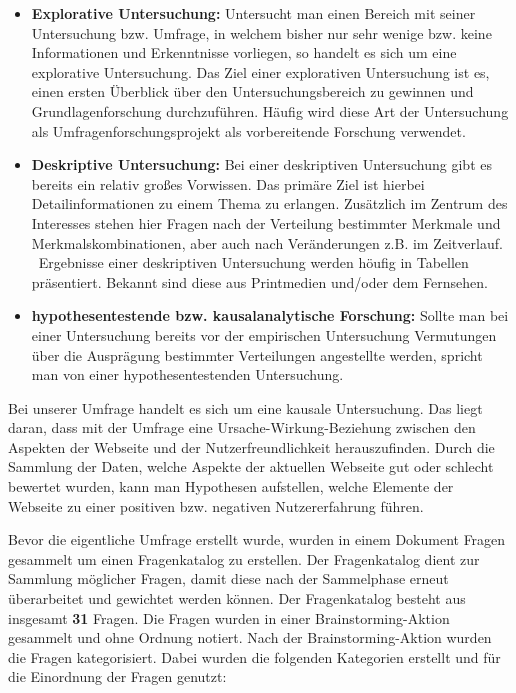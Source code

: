 \begin{itemize}
    \item \textbf{Explorative Untersuchung:} Untersucht man einen Bereich mit seiner Untersuchung bzw. Umfrage, in welchem bisher nur sehr wenige bzw. keine Informationen und Erkenntnisse vorliegen, so handelt es sich um eine explorative Untersuchung. Das Ziel einer explorativen Untersuchung ist es, einen ersten Überblick über den Untersuchungsbereich zu gewinnen und Grundlagenforschung durchzuführen. Häufig wird diese Art der Untersuchung als Umfragenforschungsprojekt als vorbereitende Forschung verwendet. \cite{umfrage:2011}
    \item \textbf{Deskriptive Untersuchung:} Bei einer deskriptiven Untersuchung gibt es bereits ein relativ großes Vorwissen. Das primäre Ziel ist hierbei Detailinformationen zu einem Thema zu erlangen. Zusätzlich im Zentrum des Interesses stehen hier Fragen nach der Verteilung bestimmter Merkmale und Merkmalskombinationen, aber auch nach Veränderungen z.B. im Zeitverlauf. \cite{umfrage:2011}\ Ergebnisse einer deskriptiven Untersuchung werden höufig in Tabellen präsentiert. Bekannt sind diese aus Printmedien und/oder dem Fernsehen.\cite{umfrage:2011}
    \item \textbf{hypothesentestende bzw. kausalanalytische Forschung:} Sollte man bei einer Untersuchung bereits vor der empirischen Untersuchung Vermutungen über die Ausprägung bestimmter Verteilungen angestellte werden, spricht man von einer hypothesentestenden Untersuchung.\cite{umfrage:2011}
\end{itemize}

Bei unserer Umfrage handelt es sich um eine kausale Untersuchung.
Das liegt daran, dass mit der Umfrage eine Ursache-Wirkung-Beziehung zwischen den Aspekten der Webseite und der Nutzerfreundlichkeit herauszufinden.
Durch die Sammlung der Daten, welche Aspekte der aktuellen Webseite gut oder schlecht bewertet wurden, kann man Hypothesen aufstellen, welche Elemente der Webseite zu einer positiven bzw. negativen Nutzererfahrung führen.\

Bevor die eigentliche Umfrage erstellt wurde, wurden in einem Dokument Fragen gesammelt um einen Fragenkatalog zu erstellen. Der Fragenkatalog dient zur Sammlung möglicher Fragen, damit diese nach der Sammelphase erneut überarbeitet und gewichtet werden können.
Der Fragenkatalog besteht aus insgesamt \textbf{31} Fragen.
Die Fragen wurden in einer Brainstorming-Aktion gesammelt und ohne Ordnung notiert.
Nach der Brainstorming-Aktion wurden die Fragen kategorisiert.
Dabei wurden die folgenden Kategorien erstellt und für die Einordnung der Fragen genutzt:

